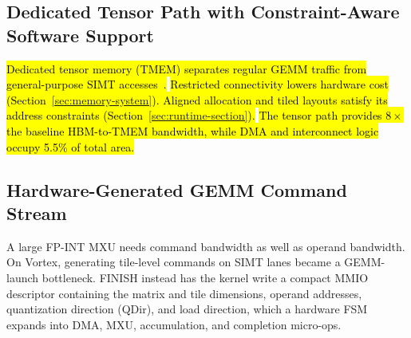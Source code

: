 \documentclass[sigconf,anonymous,nonacm]{acmart}
\newcommand{\fpint}{FP-INT}
\DeclareRobustCommand{\rev}[1]{\hl{#1}}
\begin{document}
\subsection{Dedicated Tensor Path with Constraint-Aware Software Support}
\rev{Dedicated tensor memory (TMEM) separates regular GEMM traffic from general-purpose SIMT accesses~\cite{dissecting_hopper,virgo}.} \rev{Restricted connectivity lowers hardware cost (Section~\ref{sec:memory-system}). Aligned allocation and tiled layouts satisfy its address constraints (Section~\ref{sec:runtime-section}).} \rev{The tensor path provides $8\times$ the baseline HBM-to-TMEM bandwidth, while DMA and interconnect logic occupy 5.5\% of total area.}

\subsection{Hardware-Generated GEMM Command Stream}
A large \fpint{} MXU needs command bandwidth as well as operand bandwidth. 
On Vortex, generating tile-level commands on SIMT lanes became a GEMM-launch bottleneck. 
FINISH instead has the kernel write a compact MMIO descriptor containing the matrix and tile dimensions, operand addresses, quantization direction (QDir), and load direction, which a hardware FSM expands into DMA, MXU, accumulation, and completion micro-ops.
\end{document}
